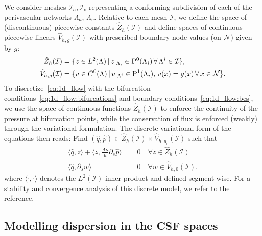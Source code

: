 We consider meshes $\mathcal{I}_a, \mathcal{I}_v$ representing a
conforming subdivision of each of the perivascular networks
$\Lambda_a$, $\Lambda_v$. Relative to each mesh $\mathcal{I}$, we define the
space of (discontinuous) piecewise constants $\hat{Z}_h(\mathcal{I})$ and define
spaces of continuous piecewise linears $\hat{V}_{h, g}(\mathcal{I})$ with
prescribed boundary node values (on $\mathcal{N}$) given by $g$:
\begin{align}
  \hat{Z}_h(\mathcal{I}) &= \{z \in L^2(\Lambda) \, | \, z \vert_{\Lambda_i} \in \mathrm{P}^{0}(\Lambda_i) \, \forall \, \Lambda^i \in \mathcal{I}\}, \\
  \hat{V}_{h, g}(\mathcal{I}) &= \{ v \in C^0(\Lambda) \, | \, v \vert_{\Lambda^i} \in \mathrm{P}^1(\Lambda_i), \, v(x) = g(x) \, \forall \, x \in \mathcal{N} \} .
\end{align}
To discretize~\eqref{eq:1d_flow} with the bifurcation
conditions~\eqref{eq:1d_flow:bifurcations} and boundary
conditions~\eqref{eq:1d_flow:bcs}, we use the space of continuous
functions $\hat{Z}_h(\mathcal{I})$ to enforce the continuity of the pressure at
bifurcation points, while the conservation of flux is enforced
(weakly) through the variational formulation. The discrete variational form of the equations then reads: Find $(\hat{q}, \hat{p}) \in \hat{Z}_h(\mathcal{I}) \times \hat{V}_{h, p_0}(\mathcal{I})$ such that
\begin{subequations}
\begin{align}
  \langle \hat{q}, z \rangle +  \langle z, \frac{A \kappa}{\mu} \partial_s \hat{p}  \rangle &= 0 \quad \forall z \in \hat{Z}_h(\mathcal{I}) \\
  \langle \hat{q}, \partial_s w \rangle &= 0 \quad  \forall w \in \hat{V}_{h, 0}(\mathcal{I}).
\end{align}
\end{subequations}%
where $\langle \cdot, \cdot \rangle$ denotes the $L^2(\mathcal{I})$-inner product and defined segment-wise. For a stability and convergence analysis of this discrete model, we refer to the reference\cite{gjerde2024directional}. 


\subsection{Modelling dispersion in the CSF spaces}
\label{sec:supp:dispersion}

